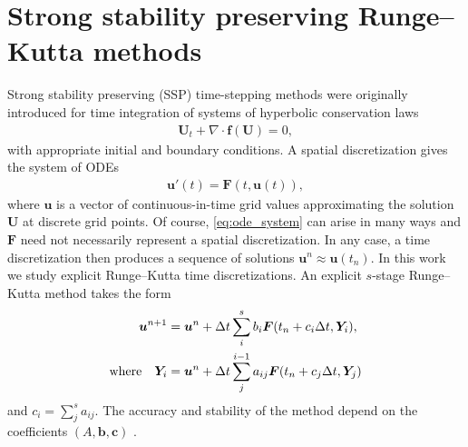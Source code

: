 \section{Strong stability preserving Runge--Kutta methods}\label{sec:SSP}
Strong stability preserving (SSP) time-stepping methods were originally introduced
for time integration of systems of hyperbolic conservation laws
\cite{Shu/Osher:1988} 
\begin{align}\label{eq:pde}
	\bm{U}_t + \nabla \cdot \bm{f}(\bm{U}) = 0,   
\end{align}
with appropriate initial and boundary conditions.
A spatial discretization gives the system of ODEs
\begin{align}\label{eq:ode_system}
    \bm{u}'(t) = \bm{F}(t,\bm{u}(t)),
\end{align}
where $\bm{u}$ is a vector of continuous-in-time grid values approximating 
the solution $\bm{U}$ at discrete grid points.
Of course, \eqref{eq:ode_system} can arise in many ways and $\bm{F}$
need not necessarily represent a spatial discretization.
In any case, a time discretization then produces a sequence of
solutions $\bm{u}^{n} \approx \bm{u}(t_n)$.
In this work we study explicit Runge--Kutta time discretizations.
An explicit $s$-stage Runge--Kutta method takes the form
\begin{align*}
	\bm{u}^{n+1} &= \bm{u}^{n} + \Delta t \sum_i^s b_i \bm{F}(t_n + c_i \Delta t,\bm{Y}_i), \\
	\text{where} \quad \bm{Y}_i &= \bm{u}^{n} + \Delta t \sum_j^{i-1} a_{ij} \bm{F}(t_n + c_j \Delta t,\bm{Y}_j)
\end{align*}
and $c_i = \sum_j^sa_{ij}$.
The accuracy and stability of the method depend on the coefficients
$(A,\bm{b},\bm{c})$ \cite{Butcher2008_book}.

